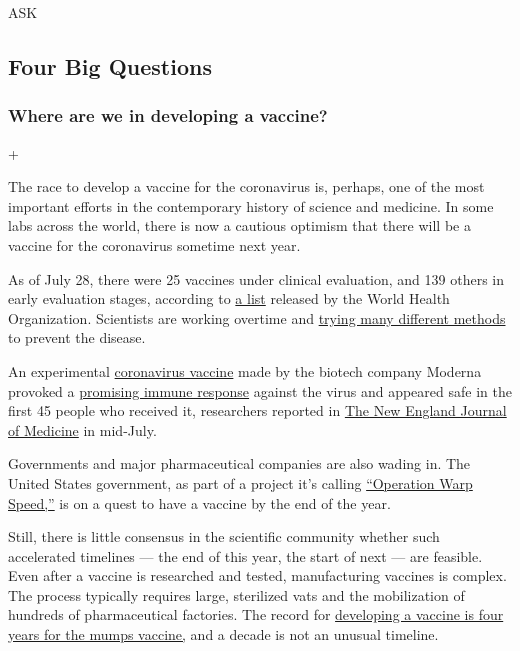ASK

\hypertarget{four-big-questions}{%
\subsection{Four Big Questions}\label{four-big-questions}}

\hypertarget{where-are-we-in-developing-a-vaccine}{%
\subsubsection{Where are we in developing a
vaccine?}\label{where-are-we-in-developing-a-vaccine}}

+

The race to develop a vaccine for the coronavirus is, perhaps, one of
the most important efforts in the contemporary history of science and
medicine. In some labs across the world, there is now a cautious
optimism that there will be a vaccine for the coronavirus sometime next
year.

As of July 28, there were 25 vaccines under clinical evaluation, and 139
others in early evaluation stages, according to
\href{https://www.who.int/publications/m/item/draft-landscape-of-covid-19-candidate-vaccines}{a
list} released by the World Health Organization. Scientists are working
overtime and
\href{https://www.nytimes3xbfgragh.onion/interactive/2020/05/20/science/coronavirus-vaccine-development.html}{trying
many different methods} to prevent the disease.

An experimental
\href{https://www.nytimes3xbfgragh.onion/interactive/2020/science/coronavirus-vaccine-tracker.html}{coronavirus
vaccine} made by the biotech company Moderna provoked a
\href{https://www.nytimes3xbfgragh.onion/2020/07/14/health/cornavirus-vaccine-moderna.html}{promising
immune response} against the virus and appeared safe in the first 45
people who received it, researchers reported in
\href{https://www.nejm.org/coronavirus?query=RP}{The New England Journal
of Medicine} in mid-July.

Governments and major pharmaceutical companies are also wading in. The
United States government, as part of a project it's calling
\href{https://www.nytimes3xbfgragh.onion/2020/06/03/us/politics/coronavirus-vaccine-trump-moderna.html}{``Operation
Warp Speed,''} is on a quest to have a vaccine by the end of the year.

Still, there is little consensus in the scientific community whether
such accelerated timelines --- the end of this year, the start of next
--- are feasible. Even after a vaccine is researched and tested,
manufacturing vaccines is complex. The process typically requires large,
sterilized vats and the mobilization of hundreds of pharmaceutical
factories. The record for
\href{https://www.nytimes3xbfgragh.onion/interactive/2020/06/09/magazine/covid-vaccine.html}{developing
a vaccine is four years for the mumps vaccine,} and a decade is not an
unusual timeline.

